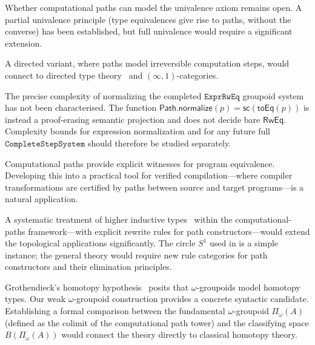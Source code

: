 \documentclass[manuscript]{BSLstyle}
\newcommand{\RwEq}{\mathsf{RwEq}}
\begin{document}
\begin{problem}[Univalence]\label{prob:univalence}
Whether computational paths can model the univalence axiom remains open.
A partial univalence principle (type equivalences give rise to paths,
without the converse) has been established, but full univalence would
require a significant extension.
\end{problem}

\begin{problem}\label{prob:directed}
A directed variant, where paths model irreversible computation steps,
would connect to directed type theory~\cite{RiehlShulman17} and
$(\infty, 1)$-categories.
\end{problem}

\begin{problem}\label{prob:complexity}
The precise complexity of normalizing the completed
\(\texttt{ExprRwEq}\) groupoid system has not been characterised.
The function
\(\mathsf{Path.normalize}(p)=\mathsf{sc}(\mathsf{toEq}(p))\)
is instead a proof-erasing semantic projection and does not decide bare
\(\RwEq\).  Complexity bounds for expression normalization and for any future
full \(\texttt{CompleteStepSystem}\) should therefore be studied separately.
\end{problem}

\begin{problem}\label{prob:verification}
Computational paths provide explicit witnesses for program equivalence.
Developing this into a practical tool for verified compilation---where
compiler transformations are certified by paths between source and
target programs---is a natural application.
\end{problem}

\begin{problem}\label{prob:hits}
A systematic treatment of higher inductive types~\cite{hottbook} within the
computational-paths framework---with explicit rewrite rules for path
constructors---would extend the topological applications significantly.
The circle $S^1$ used in  is a simple instance;
the general theory would require new rule categories for path constructors
and their elimination principles.
\end{problem}

\begin{problem}\label{prob:grothendieck}
Grothendieck's homotopy hypothesis~\cite{Grothendieck83} posits that
$\omega$-groupoids model homotopy types.  Our weak $\omega$-groupoid
construction provides a concrete syntactic candidate.  Establishing a
formal comparison between the fundamental $\omega$-groupoid
$\Pi_\omega(A)$ (defined as the colimit of the computational path tower)
and the classifying space $B(\Pi_\omega(A))$ would connect the theory
directly to classical homotopy theory.
\end{problem}
\end{document}

